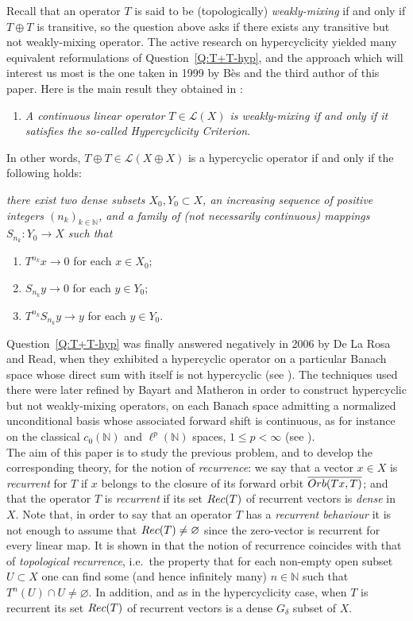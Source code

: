 \documentclass[openright,11pt]{article}
\theoremstyle{plain}
\theoremstyle{definition}
\newcommand{\NN}{\mathbb{N}}
\newcommand{\Lc}{\mathcal{L}}
\newcommand{\Rec}{\textup{Rec}}
\newcommand{\cl}{\overline}
\newcommand{\orb}{\textup{Orb}}
\begin{document}
Recall that an operator $T$ is said to be (topologically) {\em weakly-mixing} if and only if $T\oplus T$ is transitive, so the question above asks if there exists any transitive but not weakly-mixing operator. The active research on hypercyclicity yielded many equivalent reformulations of Question~\ref{Q:T+T-hyp}, and the approach which will interest us most is the one taken in 1999 by B\`es and the third author of this paper. Here is the main result they obtained in \cite{BesPe1999}:
\begin{enumerate}[--]
	\item {\em A continuous linear operator $T \in \Lc(X)$ is weakly-mixing if and only if it satisfies the so-called Hypercyclicity Criterion}.
\end{enumerate}
In other words, $T\oplus T \in \Lc(X\oplus X)$ is a hypercyclic operator if and only if the following holds: {\em there exist two dense subsets $X_0,Y_0 \subset X$, an increasing sequence of positive integers $(n_k)_{k\in\NN}$, and a family of (not necessarily continuous) mappings $S_{n_k}:Y_0\longrightarrow X$ such that
\begin{enumerate}[{\em(i)}]
	\item $T^{n_k}x \to 0$ for each $x \in X_0$;
	
	\item $S_{n_k}y \to 0$ for each $y \in Y_0$;
	
	\item $T^{n_k}S_{n_k}y \to y$ for each $y \in Y_0$. 
\end{enumerate}}
Question~\ref{Q:T+T-hyp} was finally answered negatively in 2006 by De La Rosa and Read, when they exhibited a hypercyclic operator on a particular Banach space whose direct sum with itself is not hypercyclic (see \cite{DeRead2009}). The techniques used there were later refined by Bayart and Matheron in order to construct hypercyclic but not weakly-mixing operators, on each Banach space admitting a normalized unconditional basis whose associated forward shift is continuous, as for instance on the classical $c_0(\NN)$ and $\ell^p(\NN)$ spaces, $1\leq p<\infty$ (see \cite{BaMa2007nwm,BaMa2009nwm}).\\[-5pt]

The aim of this paper is to study the previous problem, and to develop the corresponding theory, for the notion of {\em recurrence}: we say that a vector $x \in X$ is {\em recurrent} for $T$ if $x$ belongs to the closure of its forward orbit $\cl{\orb(Tx,T)}$; and that the operator $T$ is {\em recurrent} if its set $\Rec(T)$ of recurrent vectors is {\em dense} in $X$. Note that, in order to say that an operator $T$ has a {\em recurrent behaviour} it is not enough to assume that $\Rec(T)\neq\varnothing$ since the zero-vector is recurrent for every linear map. It is shown in \cite[Proposition~2.1]{CoMaPa2014} that the notion of recurrence coincides with that of {\em topological recurrence}, i.e.\ the property that for each non-empty open subset $U \subset X$ one can find some (and hence infinitely many) $n \in \NN$ such that $T^n(U) \cap U \neq \varnothing$. In addition, and as in the hypercyclicity case, when $T$ is recurrent its set $\Rec(T)$ of recurrent vectors is a dense $G_{\delta}$ subset of $X$.\\[-5pt]
\end{document}
